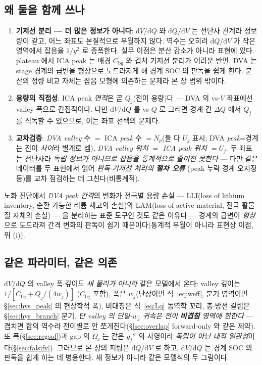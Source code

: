 \documentclass[11pt,a4paper]{article}
\newcommand{\dd}{\mathrm{d}}
\newcommand{\bg}{\mathrm{bg}}
\begin{document}
\subsection{왜 둘을 함께 쓰나}
\begin{enumerate}[label=(\roman*),leftmargin=2.0em,itemsep=2pt]
\item \textbf{기저선 분리 — 더 많은 정보가 아니다}: $\dd V/\dd Q$ 와 $\dd Q/\dd V$ 는 전단사 관계라
  정보량이 같고, 어느 좌표도 본질적으로 우월하지 않다. 역수는 오히려 $\dd Q/\dd V$ 가 작은 영역에서 잡음을
  $1/y^2$ 로 증폭한다. 실무 이점은 분산 감소가 아니라 표현에 있다. plateau 에서 ICA peak 는 배경 $C_\bg$ 와
  겹쳐 기저선 분리가 어려운 반면, DVA 는 stage 경계의 급변을 형상으로 도드라지게 해 경계 SOC 의 판독을 쉽게
  한다. 분산의 정량 비교 자체는 잡음 모형에 의존하는 문제라 본 장 범위 밖이다.
\item \textbf{용량의 직접성}: ICA peak \emph{면적}은 곧 $Q_j$(전이 용량)다 — DVA 의 vs-$V$ 좌표에선 valley 폭으로
  간접적이다. 다만 $\dd V/\dd Q$ 를 vs-$Q$ 로 그리면 경계 간 $\Delta Q$ 에서 $Q_j$ 를 직독할 수 있으므로,
  이는 좌표 선택의 문제다.
\item \textbf{교차검증}: \emph{DVA valley} 수 $=$ ICA \emph{peak} 수 $=N_p$(둘 다 $U_j$ 표시; DVA \emph{peak}=경계는 전이
  \emph{사이}라 별개로 셈), \emph{DVA valley 위치 $=$ ICA peak 위치 $=U_j$}. 두 좌표는 전단사라 \emph{독립 정보가 아니므로
  잡음을 통계적으로 줄이진 못한다} — 다만 같은 데이터를 두 표현에서 읽어 \emph{판독$\cdot$기저선 처리의 \textbf{절차 오류}}
  (peak 누락$\cdot$경계 오지정 등)를 교차 점검하는 데 그친다(비통계적).
\end{enumerate}
노화 진단에서 \emph{DVA peak 간격}의 변화가 전극별 용량 손실 — LLI(loss of lithium inventory, 순환 가능한
리튬 재고의 손실)와 LAM(loss of active material, 전극 활물질 자체의 손실) — 을 분리하는 표준 도구인 것도 같은
이유다 \cite{dubarry2012,bloom2005} — 경계의 급변이 \emph{형상}으로 도드라져 간격 변화의 판독이 쉽기 때문이다(통계적
우월이 아니라 표현상 이점, 위 (i)).

\subsection{같은 파라미터, 같은 의존}
$\dd V/\dd Q$ 의 valley 폭$\cdot$깊이도 \emph{새 물리가 아니라} 같은 모델에서 온다: valley 깊이는
$1/[C_\bg+Q_j/(4w_j)]$ ($C_\bg$ 포함), 폭은 $w_j$(단상이면 식~\eqref{eq:weff}, 분기 영역이면 \S\ref{sec:hys_peak} 의 현상학적 폭), 비대칭은
식~\eqref{eq:Lq} 동역학 꼬리, 충$\cdot$방전 갈림은 \S\ref{sec:hys_branch} 분기. \emph{단 valley 의 단일-$w_j$ 귀속은 전이
\textbf{비겹침} 영역에 한한다} — 겹치면 합의 역수라 전이별로 안 쪼개진다(\S\ref{sec:overlap} forward-only 와 같은 제약).
또 폭(\S\ref{sec:regsol})과 gap 의 $\Omega_j$ 는 같은 $g_j''$ 의 사영이라 \emph{독립이 아닌 내적 일관성}이다(\S\ref{sec:falsify}).
그러므로 본 장의 피팅은 $\dd Q/\dd V$ 로 하고, $\dd V/\dd Q$ 는 경계 SOC 의 판독을 쉽게 하는 데 병용한다.
새 정보가 아니라 같은 모델식의 두 그림이다.
\end{document}

